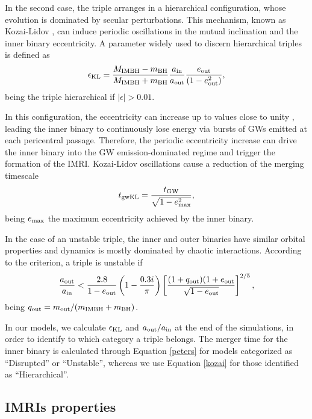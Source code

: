 \documentclass[useAMS,usenatbib]{mn2e}
\newcommand{\gw}{{\rm GW}}
\newcommand{\kl}{{\rm KL}}
\newcommand{\imbh}{{\rm IMBH}}
\newcommand{\inn}{{\rm in}}
\newcommand{\out}{{\rm out}}
\newcommand{\bh}{{\rm BH}}
\begin{document}
In the second case, the triple arranges in a hierarchical configuration, whose evolution is dominated by secular perturbations. This mechanism, known as Kozai-Lidov \citep{kozai62,lidov62}, can induce periodic oscillations in the mutual inclination and the inner binary eccentricity. A parameter widely used to discern hierarchical triples is defined as \citep{Lithwick11,naoz11}
\begin{equation}
\epsilon_\kl = \frac{M_\imbh - m_\bh }{M_\imbh + m_\bh} \frac{a_{\inn}}{a_{\out}}\frac{e_{\out}}{(1-e_{\out}^2)},
\end{equation}
being the triple hierarchical if $|\epsilon| > 0.01$.

In this configuration, the eccentricity can increase up to values close to unity \citep{naoz11,naoz16}, leading the inner binary to continuously lose energy via bursts of GWs emitted at each pericentral passage. Therefore, the periodic eccentricity increase can drive the inner binary into the GW emission-dominated regime and trigger the formation of the IMRI. Kozai-Lidov oscillations cause a reduction of the merging timescale \citep[see for instance]{antonini12}
\begin{equation}
    t_{\rm gwKL} = \frac{t_\gw}{\sqrt{1-e_{\rm max}^2}},
\label{kozai}
\end{equation}
being $e_{\rm max}$ the maximum eccentricity achieved by the inner binary. 

In the case of an unstable triple, the inner and outer binaries have similar orbital properties and dynamics is mostly dominated by chaotic interactions. According to the \cite{mardling01} criterion, a triple is unstable if
\begin{equation}
    \frac{a_\out}{a_\inn} < \frac{2.8}{1-e_\out}\left(1-\frac{0.3i}{\pi}\right)\left[\frac{(1+q_\out)(1+e_\out}{\sqrt{1-e_\out}}\right]^{2/5}, 
\end{equation}
being $q_\out = m_\out/(m_\imbh + m_\bh)$.

In our models, we calculate $\epsilon_\kl$ and $a_\out/a_\inn$ at the end of the simulations, in order to identify to which category a triple belongs. The merger time for the inner binary is calculated through Equation \ref{peters} for models categorized as ``Disrupted'' or ``Unstable'', whereas we use Equation \ref{kozai} for those identified as ``Hierarchical''. 

\subsection{IMRIs properties}
\end{document}
